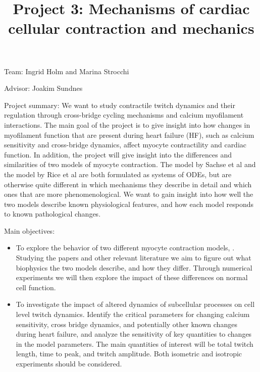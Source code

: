 \documentclass[epsfig,11pt]{article}
\title{Project 3: Mechanisms of cardiac cellular contraction and mechanics}
\begin{document}
\maketitle

\begin{description}
\item{Team:} Ingrid Holm and Marina Strocchi
\item{Advisor:} Joakim Sundnes

\item{Project summary:}
We want to study contractile twitch dynamics and their regulation through cross-bridge cycling mechanisms and calcium myofilament interactions. The main goal of the project is to give insight into how changes in myofilament function that are present during heart failure (HF), such as calcium sensitivity and cross-bridge dynamics, affect myocyte contractility and cardiac function. In addition, the project will give insight into the differences and similarities of two models of myocyte contraction. The model by Sachse et al \cite{Sachse:2003} and the model by Rice et al \cite{Rice:2008jd} are both formulated as systems of ODEs, but are otherwise quite different in which mechanisms they describe in detail and which ones that are more phenomenological. We want to gain insight into how well the two models describe known physiological features, and
how each model responds to known pathological changes. 

\item{Main objectives:} 
\begin{itemize}
\item To explore the behavior of two different myocyte contraction models, \cite{Sachse:2003,Rice:2008jd}. Studying the papers and other relevant literature we aim to figure out what biophysics the two models describe, and how they differ. Through numerical experiments we will then explore the impact of these differences on normal cell function. 
\item To investigate the impact of altered dynamics of subcellular processes on cell level twitch dynamics. Identify the critical parameters for changing calcium sensitivity, cross bridge dynamics, and potentially other known changes during heart failure, and analyze the sensitivity of key quantities to changes in the model parameters. The main quantities of interest will be total twitch length, time to peak, and twitch amplitude. Both isometric and isotropic experiments should be considered.
\end{itemize}


\end{description}
\end{document}
